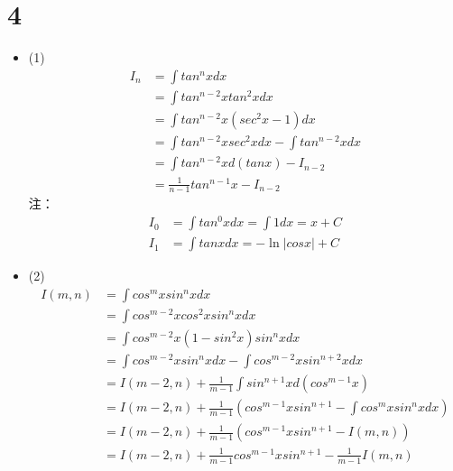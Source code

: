 \documentclass{article}
\begin{document}
\section*{4}

\begin{itemize}
  \item (1)
        \begin{align*}
          I_n & = \int tan^n x dx                                   \\
              & = \int tan^{n-2} x tan^2 x dx                       \\
              & = \int tan^{n-2} x (sec^2 x - 1) dx                 \\
              & = \int tan^{n-2} x sec^2 x dx - \int tan^{n-2} x dx \\
              & = \int tan^{n-2} x d(tanx) - I_{n - 2}              \\
              & = \frac{1}{n - 1} tan^{n - 1} x - I_{n - 2}
        \end{align*}
        注：
        \begin{align*}
          I_0 & = \int tan^0 x dx = \int 1 dx = x + C \\
          I_1 & = \int tan x dx = - \ln |cos x| + C
        \end{align*}
  \item (2)
        \begin{align*}
          I(m, n) & = \int cos^m x sin^n x dx                                                               \\
                  & = \int cos^{m - 2} x cos^2 x sin^n x dx                                                 \\
                  & = \int cos^{m - 2} x (1 - sin^2 x) sin^n x dx                                           \\
                  & = \int cos^{m - 2} x sin^n x dx - \int cos^{m - 2} x sin^{n + 2} x dx                   \\
                  & = I(m - 2, n) + \frac{1}{m - 1} \int sin^{n + 1} x d(cos^{m - 1} x)                     \\
                  & = I(m - 2, n) + \frac{1}{m - 1} (cos^{m - 1} x sin^{n + 1} - \int cos^{m} x sin^n x dx) \\
                  & = I(m - 2, n) + \frac{1}{m - 1} (cos^{m - 1} x sin^{n + 1} - I(m, n))                   \\
                  & = I(m - 2, n) + \frac{1}{m - 1} cos^{m - 1} x sin^{n + 1} - \frac{1}{m - 1} I(m, n)

\end{align*}
\end{itemize}
\end{document}
